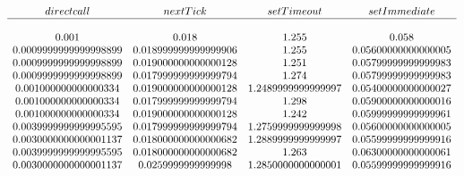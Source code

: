 \[\begin{array}{cccc}
direct call & nextTick & setTimeout & setImmediate \\
\hline \\
0.001 & 0.018 & 1.255 & 0.058 \\
0.0009999999999998899 & 0.018999999999999906 & 1.255 & 0.05600000000000005 \\
0.0009999999999998899 & 0.019000000000000128 & 1.251 & 0.05799999999999983 \\
0.0009999999999998899 & 0.017999999999999794 & 1.274 & 0.05799999999999983 \\
0.001000000000000334 & 0.019000000000000128 & 1.2489999999999997 & 0.05400000000000027 \\
0.001000000000000334 & 0.017999999999999794 & 1.298 & 0.05900000000000016 \\
0.001000000000000334 & 0.019000000000000128 & 1.242 & 0.05999999999999961 \\
0.0039999999999995595 & 0.017999999999999794 & 1.2759999999999998 & 0.05600000000000005 \\
0.0030000000000001137 & 0.018000000000000682 & 1.2889999999999997 & 0.05599999999999916 \\
0.0039999999999995595 & 0.018000000000000682 & 1.263 & 0.06300000000000061 \\
0.0030000000000001137 & 0.0259999999999998 & 1.2850000000000001 & 0.05599999999999916\\
\end{array}\]